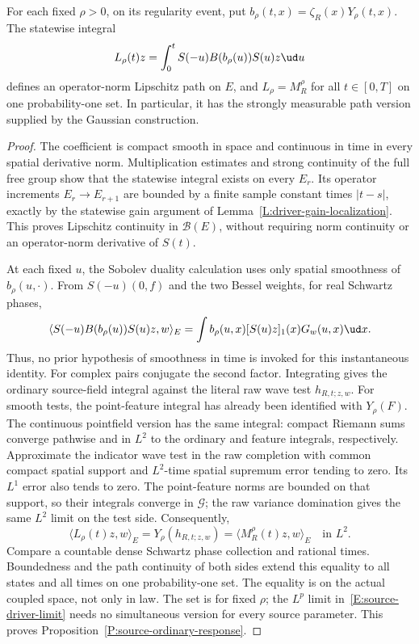 \begin{proposition}\label{P:source-ordinary-response}
  For each fixed $\rho>0$, on its regularity event, put
  $b_\rho(t,x)=\zeta_R(x)Y_\rho(t,x)$. The statewise integral
  \begin{equation}\label{E:source-ordinary-response}
    L_\rho(t)z=\int_0^tS(-u)B(b_\rho(u))S(u)z\ud u
  \end{equation}
  defines an operator-norm Lipschitz path on $E$, and
  $L_\rho=M_R^\rho$ for all $t\in[0,T]$ on one probability-one set.
  In particular, it has the strongly measurable path version supplied
  by the Gaussian construction.
\end{proposition}

\begin{proof}
  The coefficient is compact smooth in space and continuous in time in
  every spatial derivative norm. Multiplication estimates and strong
  continuity of the full free group show that the statewise integral
  exists on every $E_r$. Its operator increments $E_r\to E_{r+1}$
  are bounded by a finite sample constant times $|t-s|$, exactly by the
  statewise gain argument of Lemma~\ref{L:driver-gain-localization}.
  This proves Lipschitz continuity in $\mathcal B(E)$, without requiring
  norm continuity or an operator-norm derivative of $S(t)$.

  At each fixed $u$, the Sobolev duality calculation uses only spatial
  smoothness of $b_\rho(u,\cdot)$. From $S(-u)(0,f)$ and the two Bessel
  weights, for real Schwartz phases,
  \[
    \langle S(-u)B(b_\rho(u))S(u)z,w\rangle_E
    =\int b_\rho(u,x)[S(u)z]_1(x)G_w(u,x)\ud x.
  \]
  Thus, no prior hypothesis of smoothness in time is invoked for this
  instantaneous identity. For complex pairs conjugate the second factor.
  Integrating gives the ordinary source-field integral against the literal
  raw wave test $h_{R,t;z,w}$. For smooth tests, the point-feature integral
  has already been identified with $Y_\rho(F)$. The continuous pointfield
  version has the same integral: compact Riemann sums converge pathwise
  and in $L^2$ to the ordinary and feature integrals, respectively.
  Approximate the indicator wave test in the raw completion with common
  compact spatial support and $L^2$-time spatial supremum error tending
  to zero. Its $L^1$ error also tends to zero. The point-feature norms
  are bounded on that support, so their integrals converge in $\mathcal G$;
  the raw variance domination gives the same $L^2$ limit on the test side.
  Consequently,
  \[
    \langle L_\rho(t)z,w\rangle_E
    =Y_\rho(h_{R,t;z,w})
    =\langle M_R^\rho(t)z,w\rangle_E
    \quad\text{in }L^2.
  \]
  Compare a countable dense Schwartz phase collection and rational times.
  Boundedness and the path continuity of both sides extend this equality
  to all states and all times on one probability-one set. The equality
  is on the actual coupled space, not only in law. The set is for fixed
  $\rho$; the $L^p$ limit in~\eqref{E:source-driver-limit} needs no
  simultaneous version for every source parameter.
  This proves Proposition~\ref{P:source-ordinary-response}.
\end{proof}

